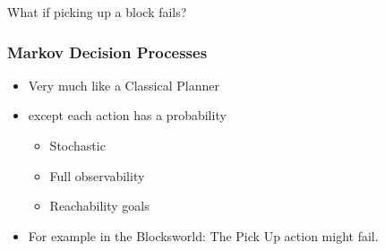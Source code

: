 \documentclass{beamer}
\let\origframetitle=\frametitle
\renewcommand\frametitle[1]{\origframetitle{\textbf{\large{\textrm{#1}}}}}
\begin{document}
\begin{frame}
\begin{columns}
  \end{columns}

  \vspace{1cm}
   {What if picking up a block fails?}

\end{frame}

\begin{frame}
  \frametitle{Markov Decision Processes}

  \begin{itemize}
    \item Very much like a Classical Planner
    \item \alert{except} each action has a \alert{probability}
      \begin{itemize}
        \item \alert{Stochastic}
        \item Full observability
        \item Reachability goals
      \end{itemize}
    \item For example in the Blocksworld: The Pick Up action might fail.
  \end{itemize}

\end{frame}
\end{document}
